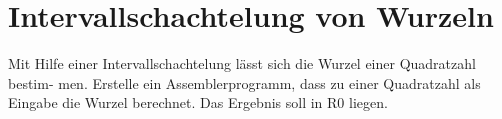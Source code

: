 \documentclass{lehramt-informatik-aufgabe}
\begin{document}
\section{Intervallschachtelung von Wurzeln}

Mit Hilfe einer Intervallschachtelung lässt sich die Wurzel einer Quadratzahl bestim-
men. Erstelle ein Assemblerprogramm, dass zu einer Quadratzahl als Eingabe die
Wurzel berechnet. Das Ergebnis soll in R0 liegen.
\end{document}
